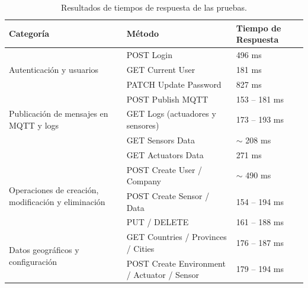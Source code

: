 \begin{table}[H]
    \centering
    \caption[Resultados de tiempos de respuesta]{Resultados de tiempos de respuesta de las pruebas.}
    \begin{tabular}{p{5cm}p{5.1cm}p{2.4cm}}
        \toprule
        \textbf{Categoría}                                                     & \textbf{Método}                             & \textbf{Tiempo de Respuesta} \\
        \midrule
        \multirow{3}{5cm}{Autenticación y usuarios}                            & POST Login                                  & 496 ms                       \\
                                                                               & GET Current User                            & 181 ms                       \\
                                                                               & PATCH Update Password                       & 827 ms                       \\
        \hline
        \multirow{3}{5cm}{Publicación de mensajes en MQTT y logs}              & POST Publish MQTT                           & 153 – 181 ms                 \\
                                                                               & GET Logs (actuadores y sensores)            & 173 – 193 ms                 \\
        \hline
        \multirow{2}{5cm}{Consulta de datos de dispositivos}                   & GET Sensors Data                            & $\sim$ 208 ms                \\
                                                                               & GET Actuators Data                          & 271 ms                       \\
        \hline
        \multirow{3}{5cm}{Operaciones de creación, modificación y eliminación} & POST Create User / Company                  & $\sim$ 490 ms                \\
                                                                               & POST Create Sensor / Data                   & 154 – 194 ms                 \\
                                                                               & PUT / DELETE                                & 161 – 188 ms                 \\
        \hline
        \multirow{4}{5cm}{Datos geográficos y configuración}                   & GET Countries / Provinces / Cities          & 176 – 187 ms                 \\
                                                                               & POST Create Environment / Actuator / Sensor & 179 – 194 ms                 \\
        \bottomrule
    \end{tabular}
    \label{tab:tiempos_respuesta}
\end{table}

